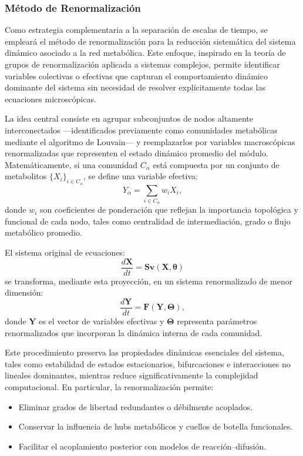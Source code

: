 \documentclass[12pt,spanish]{article}
\begin{document}
	
	\subsubsection{Método de Renormalización}
	
	Como estrategia complementaria a la separación de escalas de tiempo, se empleará el método de renormalización para la reducción sistemática del sistema dinámico asociado a la red metabólica. Este enfoque, inspirado en la teoría de grupos de renormalización aplicada a sistemas complejos, permite identificar variables colectivas o efectivas que capturan el comportamiento dinámico dominante del sistema sin necesidad de resolver explícitamente todas las ecuaciones microscópicas.
	
	La idea central consiste en agrupar subconjuntos de nodos altamente interconectados —identificados previamente como comunidades metabólicas mediante el algoritmo de Louvain— y reemplazarlos por variables macroscópicas renormalizadas que representen el estado dinámico promedio del módulo. Matemáticamente, si una comunidad $C_\alpha$ está compuesta por un conjunto de metabolitos $\{X_i\}_{i \in C_\alpha}$, se define una variable efectiva:
	\[
	Y_\alpha = \sum_{i \in C_\alpha} w_i X_i,
	\]
	donde $w_i$ son coeficientes de ponderación que reflejan la importancia topológica y funcional de cada nodo, tales como centralidad de intermediación, grado o flujo metabólico promedio.
	
	El sistema original de ecuaciones:
	\[
	\frac{d\mathbf{X}}{dt} = \mathbf{S}\mathbf{v}(\mathbf{X},\boldsymbol{\theta})
	\]
	se transforma, mediante esta proyección, en un sistema renormalizado de menor dimensión:
	\[
	\frac{d\mathbf{Y}}{dt} = \mathbf{F}(\mathbf{Y},\boldsymbol{\Theta}),
	\]
	donde $\mathbf{Y}$ es el vector de variables efectivas y $\boldsymbol{\Theta}$ representa parámetros renormalizados que incorporan la dinámica interna de cada comunidad.
	
	Este procedimiento preserva las propiedades dinámicas esenciales del sistema, tales como estabilidad de estados estacionarios, bifurcaciones e interacciones no lineales dominantes, mientras reduce significativamente la complejidad computacional. En particular, la renormalización permite:
	\begin{itemize}
		\item Eliminar grados de libertad redundantes o débilmente acoplados.
		\item Conservar la influencia de hubs metabólicos y cuellos de botella funcionales.
		\item Facilitar el acoplamiento posterior con modelos de reacción--difusión.
	\end{itemize}
	
\end{document}

